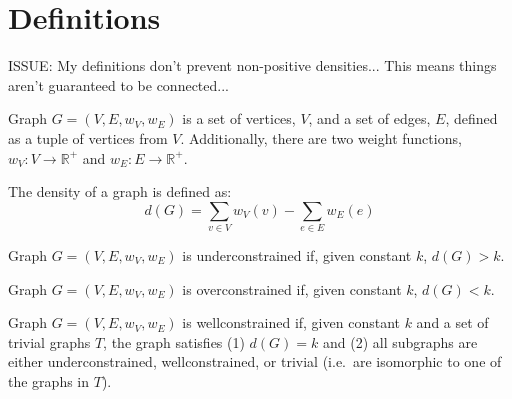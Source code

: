 \documentclass[11pt]{article}
\begin{document}



\pnmaketitle
\pnmakefooter


\section{Definitions}
ISSUE: My definitions don't prevent non-positive densities... This means things aren't guaranteed to be connected...

\begin{definition}[Graph]
Graph $G=(V,E,w_V,w_E)$ is a set of vertices, $V$, and a set of edges, $E$, defined as a tuple of vertices from $V$. Additionally, there are two weight functions, $w_V: V \to \mathbb{R}^+$ and $w_E: E \to \mathbb{R}^+$.
\end{definition}

\begin{definition}[Density]
The density of a graph is defined as:
\[d(G) = \sum_{v\in V}{w_V(v)} - \sum_{e\in E}{w_E(e)}\]
\end{definition}

\begin{definition}
Graph $G=(V,E,w_V,w_E)$ is underconstrained if, given constant $k$, $d(G) > k$.
\end{definition}

\begin{definition}
Graph $G=(V,E,w_V,w_E)$ is overconstrained if, given constant $k$, $d(G) < k$.
\end{definition}

\begin{definition}
Graph $G=(V,E,w_V,w_E)$ is wellconstrained if, given constant $k$ and a set of trivial graphs $T$, the graph satisfies (1) $d(G)=k$ and (2) all subgraphs are either underconstrained, wellconstrained, or trivial (i.e.\ are isomorphic to one of the graphs in $T$).
\end{definition}
\end{document}
